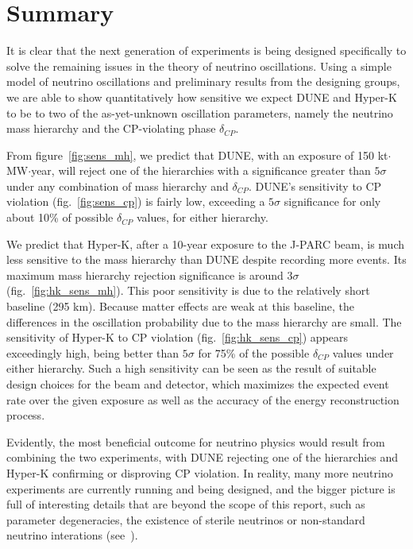 \label{ch:conclusion}
\section{Summary}
It is clear that the next generation of experiments
is being designed specifically to solve the remaining issues in the theory of
neutrino oscillations. Using a simple model of neutrino oscillations and
preliminary results from the designing groups, we are able to show
quantitatively how sensitive we expect DUNE and Hyper-K to be to two of the
as-yet-unknown oscillation parameters, namely the neutrino mass hierarchy and
the CP-violating phase $\delta_{CP}$.

From figure~\ref{fig:sens_mh}, we predict that DUNE, with an exposure of 150
kt$\cdot$MW$\cdot$year, will reject one of the hierarchies with a significance
greater than $5\sigma$ under any combination of mass hierarchy and
$\delta_{CP}$. DUNE's sensitivity to CP violation (fig.~\ref{fig:sens_cp}) is
fairly low, exceeding a $5\sigma$ significance for only about 10\% of possible
$\delta_{CP}$ values, for either hierarchy.

We predict that Hyper-K, after a 10-year exposure to the J-PARC beam, is
much less sensitive to the mass hierarchy than DUNE despite recording more
events. Its maximum mass hierarchy rejection significance is around $3\sigma$
(fig.~\ref{fig:hk_sens_mh}). This poor sensitivity is due to the relatively
short baseline (295 km). Because matter effects are weak at this baseline, the
differences in the oscillation probability due to the mass hierarchy are small.
The sensitivity of Hyper-K to CP violation (fig.~\ref{fig:hk_sens_cp}) appears
exceedingly high, being better than $5\sigma$ for 75\% of the possible
$\delta_{CP}$ values under either hierarchy. Such a high sensitivity can be
seen as the result of suitable design choices for the beam and detector,
which maximizes the expected event rate over the given exposure as well as the
accuracy of the energy reconstruction process.


Evidently, the most beneficial outcome for neutrino physics would result from
combining the two experiments, with DUNE rejecting one of the hierarchies and
Hyper-K confirming or disproving CP violation. In reality, many more neutrino
experiments are currently running and being designed, and the bigger picture is
full of interesting details that are beyond the scope of this report, such as
parameter degeneracies, the existence of sterile neutrinos or non-standard
neutrino interations (see~\cite{raut}).

